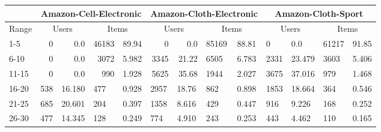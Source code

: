 \begin{table*}[]
    \centering
    \begin{tabular}{|l|l|l|l|l|l|l|l|l|l|l|l|l|}
        \hline
                & \multicolumn{4}{c|}{Amazon-Cell-Electronic} & \multicolumn{4}{c|}{Amazon-Cloth-Electronic} & \multicolumn{4}{c|}{Amazon-Cloth-Sport}                                                                                                                                        \\ \hline
        Range   & \multicolumn{2}{c|}{Users}                  & \multicolumn{2}{c|}{Items}                   & \multicolumn{2}{c|}{Users}              & \multicolumn{2}{c|}{Items} & \multicolumn{2}{c|}{Users} & \multicolumn{2}{c|}{Items}                                                 \\ \hline
        1-5     & \multicolumn{1}{r|}{0}                      & \multicolumn{1}{r|}{0.0}                     & \multicolumn{1}{r|}{46183}              & \multicolumn{1}{r|}{89.94} & \multicolumn{1}{r|}{0}     & \multicolumn{1}{r|}{0.0}   & 85169 & 88.81 & 0    & 0.0    & 61217 & 91.85 \\ \hline
        6-10    & \multicolumn{1}{r|}{0}                      & \multicolumn{1}{r|}{0.0}                     & \multicolumn{1}{r|}{3072}               & \multicolumn{1}{r|}{5.982} & \multicolumn{1}{r|}{3345}  & \multicolumn{1}{r|}{21.22} & 6505  & 6.783 & 2331 & 23.479 & 3603  & 5.406 \\ \hline
        11-15   & \multicolumn{1}{r|}{0}                      & \multicolumn{1}{r|}{0.0}                     & \multicolumn{1}{r|}{990}                & \multicolumn{1}{r|}{1.928} & \multicolumn{1}{r|}{5625}  & \multicolumn{1}{r|}{35.68} & 1944  & 2.027 & 3675 & 37.016 & 979   & 1.468 \\ \hline
        16-20   & 538                                         & 16.180                                       & 477                                     & 0.928                      & 2957                       & 18.76                      & 862   & 0.898 & 1853 & 18.664 & 364   & 0.546 \\ \hline
        21-25   & 685                                         & 20.601                                       & 204                                     & 0.397                      & 1358                       & 8.616                      & 429   & 0.447 & 916  & 9.226  & 168   & 0.252 \\ \hline
        26-30   & 477                                         & 14.345                                       & 128                                     & 0.249                      & 774                        & 4.910                      & 243   & 0.253 & 443  & 4.462  & 110   & 0.165 \\ \hline

\end{tabular}
\end{table*}
